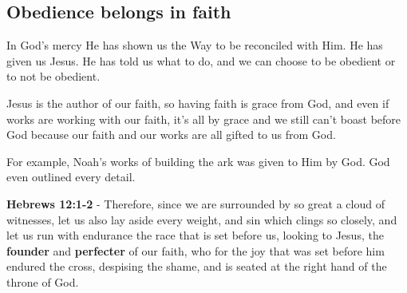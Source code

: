 \documentclass[11pt]{article}
\begin{document}
\subsection{Obedience belongs in faith}
\label{sec:orgcfeec55}
In God's mercy He has shown us the Way to be reconciled with Him. He has given us Jesus. He has told us what to do, and we can choose to be obedient or to not be obedient.

Jesus is the author of our faith, so having faith is grace from God, and even if works are working with our faith, it's all by grace and we still can't boast before God because our faith and our works are all gifted to us from God.

For example, Noah's works of building the ark was given to Him by God. God even outlined every detail.

\textbf{Hebrews 12:1-2} - Therefore, since we are surrounded by so great a cloud of witnesses, let us also lay aside every weight, and sin which clings so closely, and let us run with endurance the race that is set before us, looking to Jesus, the \textbf{founder} and \textbf{perfecter} of our faith, who for the joy that was set before him endured the cross, despising the shame, and is seated at the right hand of the throne of God.
\end{document}
